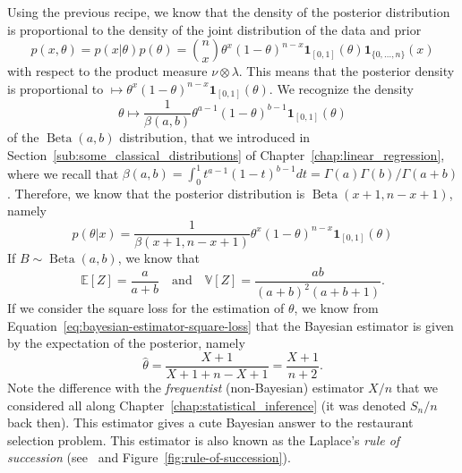\documentclass[
	fontsize=11pt, %
	twoside=false, %
	numbers=noenddot, %
]{kaobook}
\DeclareMathOperator{\bet}{Beta}
\newcommand{\E}{\mathbb E}
\newcommand{\var}{\mathbb V}
\newcommand{\wh}{\widehat}
\newcommand{\ind}[1]{\mathbf 1_{#1}}
\begin{document}
Using the previous recipe, we know that the density of the posterior distribution is proportional to the density of the joint distribution of the data and prior
\begin{equation*}{}
	p(x, \theta) = p(x | \theta) p(\theta) = \binom{n}{x} \theta^x (1 - \theta)^{n - x} \ind{[0, 1]}(\theta) \ind{\{ 0, \ldots, n\}}(x)
\end{equation*}
with respect to the product measure $\nu \otimes \lambda$.
This means that the posterior density is proportional to $\mapsto \theta^x (1 - \theta)^{n - x} \ind{[0, 1]}(\theta)$. 
We recognize the density
\begin{equation*}
	\theta \mapsto \frac{1}{\beta(a, b)} \theta^{a-1} (1 - \theta)^{b-1} \ind{[0, 1]}(\theta)
\end{equation*}
 of the $\bet(a, b)$ distribution, that we introduced in Section~\ref{sub:some_classical_distributions} of Chapter~\ref{chap:linear_regression},
where we recall that $\beta(a, b) = \int_0^1 t^{a-1} (1 - t)^{b-1} d t = \Gamma(a) \Gamma(b)  / \Gamma(a + b)$.
Therefore, we know that the posterior distribution is $\bet(x + 1, n - x + 1)$, namely
\begin{equation*}
	p(\theta | x) = \frac{1}{\beta(x + 1, n - x + 1)} \theta^{x} (1 - \theta)^{n-x} \ind{[0, 1]}(\theta)
\end{equation*}
If $B \sim \bet(a, b)$, we know that
\begin{equation*}
	\E[Z] = \frac{a}{a + b} \quad \text{and} \quad \var[Z] = \frac{ab}{(a + b)^2 (a + b + 1)}.
\end{equation*}
If we consider the square loss for the estimation of $\theta$, we know from Equation~\eqref{eq:bayesian-estimator-square-loss} that the Bayesian estimator is given by the expectation of the posterior, namely
\begin{equation*}
	\wh \theta = \frac{X + 1}{X + 1 + n - X + 1} = \frac{X + 1}{n + 2}.
\end{equation*}
Note the difference with the \emph{frequentist} (non-Bayesian) estimator $X / n$ that we considered all along Chapter~\ref{chap:statistical_inference} (it was denoted $S_n / n$ back then).
This estimator gives a cute Bayesian answer to the restaurant selection problem.
This estimator is also known as the Laplace's \emph{rule of succession} (see~ and Figure~\ref{fig:rule-of-succession}).
\end{document}

